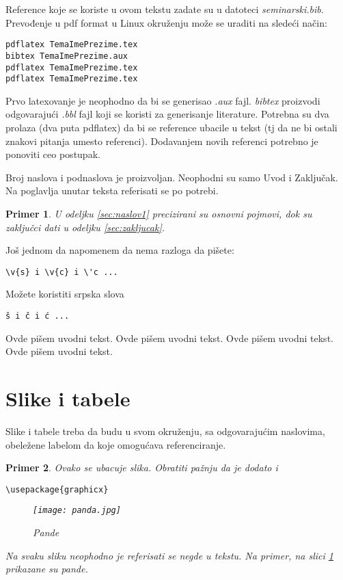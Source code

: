 \documentclass[a4paper]{article}
\newtheorem{primer}{Primer}[section]
\begin{document}
Reference koje se koriste u ovom tekstu zadate su u datoteci {\em seminarski.bib}. Prevođenje u pdf format u Linux okruženju može se uraditi na sledeći način:
\begin{verbatim}
pdflatex TemaImePrezime.tex 
bibtex TemaImePrezime.aux 
pdflatex TemaImePrezime.tex 
pdflatex TemaImePrezime.tex 
\end{verbatim}
Prvo latexovanje je neophodno da bi se generisao {\em .aux} fajl. {\em bibtex} proizvodi odgovarajući {\em .bbl} fajl koji se koristi za generisanje literature. 
Potrebna su dva prolaza (dva puta pdflatex) da bi se reference ubacile u tekst (tj da ne bi ostali znakovi pitanja umesto referenci). Dodavanjem novih referenci potrebno je ponoviti ceo postupak.  


Broj naslova i podnaslova je proizvoljan. Neophodni su samo Uvod i Zaključak. Na poglavlja unutar teksta referisati se po potrebi. 
\begin{primer}
U odeljku \ref{sec:naslov1} precizirani su osnovni pojmovi, dok su zaključci dati u odeljku \ref{sec:zakljucak}.
\end{primer}

Još jednom da napomenem da nema razloga da pišete:
\begin{verbatim}
\v{s} i \v{c} i \'c ...
\end{verbatim}
Možete koristiti srpska slova
\begin{verbatim}
š i č i ć ... 
\end{verbatim}


Ovde pišem uvodni tekst.
Ovde pišem uvodni tekst. 
Ovde pišem uvodni tekst. 
Ovde pišem uvodni tekst. 


\section{Slike i tabele}
\label{slike_i_tabele}

Slike i tabele treba da budu u svom okruženju, sa odgovarajućim naslovima, obeležene labelom da koje omogućava referenciranje. 

\begin{primer} Ovako se ubacuje slika. Obratiti pažnju da je dodato i 
\begin{verbatim}
\usepackage{graphicx}
\end{verbatim}

\begin{figure}[h!]
\begin{center}
\texttt{[image: panda.jpg]}
\end{center}
\caption{Pande}
\label{fig:pande}
\end{figure}

Na svaku sliku neophodno je referisati se negde u tekstu. Na primer, na slici \ref{fig:pande} prikazane su pande. 
\end{primer}
\end{document}
